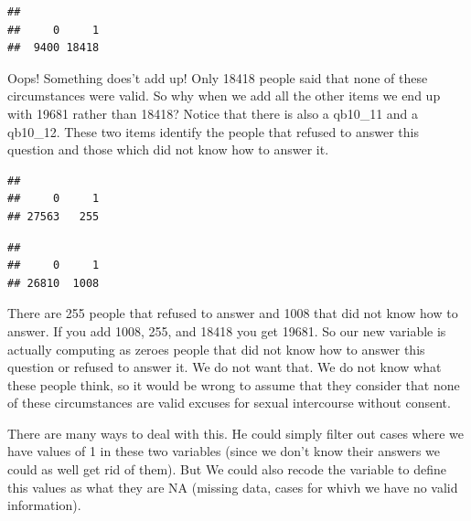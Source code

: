 \documentclass[]{book}
\newenvironment{Shaded}{\begin{snugshade}}{\end{snugshade}}
\newcommand{\DecValTok}[1]{\textcolor[rgb]{0.00,0.00,0.81}{#1}}
\newcommand{\KeywordTok}[1]{\textcolor[rgb]{0.13,0.29,0.53}{\textbf{#1}}}
\newcommand{\NormalTok}[1]{#1}
\newcommand{\OperatorTok}[1]{\textcolor[rgb]{0.81,0.36,0.00}{\textbf{#1}}}
\theoremstyle{definition}
\theoremstyle{definition}
\theoremstyle{definition}
\theoremstyle{remark}
\begin{document}
\begin{Shaded}
\end{Shaded}

\begin{verbatim}
## 
##     0     1 
##  9400 18418
\end{verbatim}

Oops! Something does't add up! Only 18418 people said that none of these
circumstances were valid. So why when we add all the other items we end
up with 19681 rather than 18418? Notice that there is also a qb10\_11
and a qb10\_12. These two items identify the people that refused to
answer this question and those which did not know how to answer it.

\begin{Shaded}
\end{Shaded}

\begin{verbatim}
## 
##     0     1 
## 27563   255
\end{verbatim}

\begin{Shaded}
\end{Shaded}

\begin{verbatim}
## 
##     0     1 
## 26810  1008
\end{verbatim}

There are 255 people that refused to answer and 1008 that did not know
how to answer. If you add 1008, 255, and 18418 you get 19681. So our new
variable is actually computing as zeroes people that did not know how to
answer this question or refused to answer it. We do not want that. We do
not know what these people think, so it would be wrong to assume that
they consider that none of these circumstances are valid excuses for
sexual intercourse without consent.

There are many ways to deal with this. He could simply filter out cases
where we have values of 1 in these two variables (since we don't know
their answers we could as well get rid of them). But We could also
recode the variable to define this values as what they are NA (missing
data, cases for whivh we have no valid information).
\end{document}
